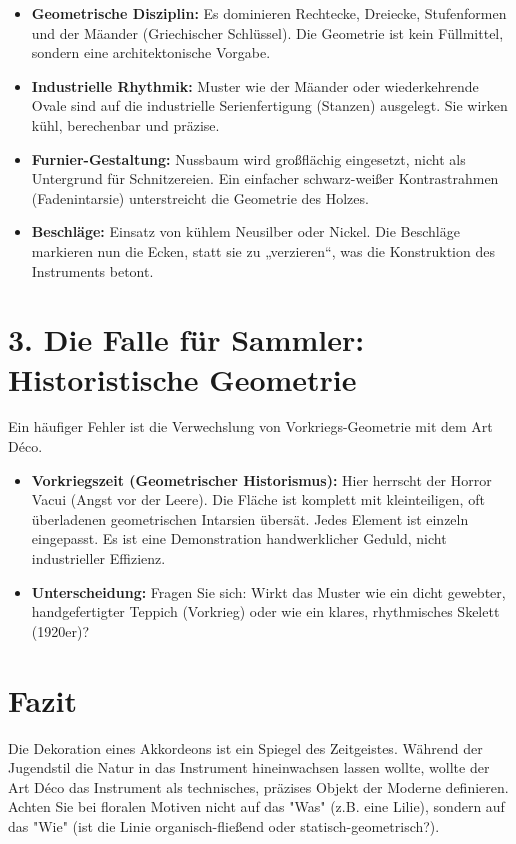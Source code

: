 \documentclass[12pt,a4paper]{report}
\begin{document}
	\begin{itemize}
		\item \textbf{Geometrische Disziplin:} Es dominieren Rechtecke, Dreiecke, Stufenformen und der Mäander (Griechischer Schlüssel). Die Geometrie ist kein Füllmittel, sondern eine architektonische Vorgabe.
		\item \textbf{Industrielle Rhythmik:} Muster wie der Mäander oder wiederkehrende Ovale sind auf die industrielle Serienfertigung (Stanzen) ausgelegt. Sie wirken kühl, berechenbar und präzise.
		\item \textbf{Furnier-Gestaltung:} Nussbaum wird großflächig eingesetzt, nicht als Untergrund für Schnitzereien. Ein einfacher schwarz-weißer Kontrastrahmen (Fadenintarsie) unterstreicht die Geometrie des Holzes.
		\item \textbf{Beschläge:} Einsatz von kühlem Neusilber oder Nickel. Die Beschläge markieren nun die Ecken, statt sie zu „verzieren“, was die Konstruktion des Instruments betont.
	\end{itemize}
	
	\section*{3. Die Falle für Sammler: Historistische Geometrie}
	Ein häufiger Fehler ist die Verwechslung von Vorkriegs-Geometrie mit dem Art Déco.
	
	\begin{itemize}
		\item \textbf{Vorkriegszeit (Geometrischer Historismus):} Hier herrscht der Horror Vacui (Angst vor der Leere). Die Fläche ist komplett mit kleinteiligen, oft überladenen geometrischen Intarsien übersät. Jedes Element ist einzeln eingepasst. Es ist eine Demonstration handwerklicher Geduld, nicht industrieller Effizienz.
		\item \textbf{Unterscheidung:} Fragen Sie sich: Wirkt das Muster wie ein dicht gewebter, handgefertigter Teppich (Vorkrieg) oder wie ein klares, rhythmisches Skelett (1920er)? 
	\end{itemize}
	
	\section*{Fazit}
	Die Dekoration eines Akkordeons ist ein Spiegel des Zeitgeistes. Während der Jugendstil die Natur in das Instrument hineinwachsen lassen wollte, wollte der Art Déco das Instrument als technisches, präzises Objekt der Moderne definieren. Achten Sie bei floralen Motiven nicht auf das "Was" (z.B. eine Lilie), sondern auf das "Wie" (ist die Linie organisch-fließend oder statisch-geometrisch?).
	
\end{document}
